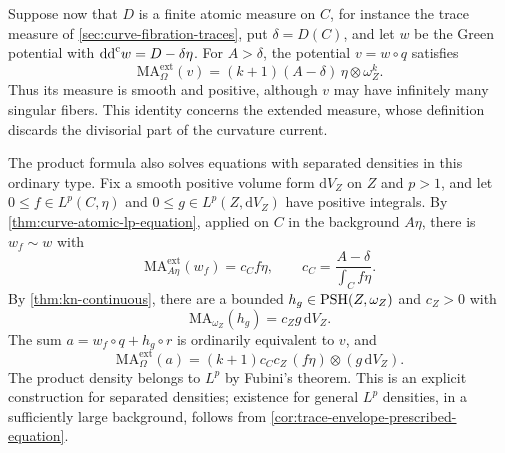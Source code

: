 Suppose now that $D$ is a finite atomic measure on $C$, for instance the trace measure of \cref{sec:curve-fibration-traces}, put $\delta=D(C)$, and let $w$ be the Green potential with $\mathrm{dd}^{\mathrm{c}} w=D-\delta\eta$. For $A>\delta$, the potential $v=w\circ q$ satisfies
\begin{equation}\label{eq:product-trace-smooth-measure}
 \mathrm{MA}^{\mathrm{ext}}_\Omega(v)
       =(k+1)(A-\delta)\,\eta\otimes\omega_Z^k.
\end{equation}
Thus its measure is smooth and positive, although $v$ may have infinitely many singular fibers. This identity concerns the extended measure, whose definition discards the divisorial part of the curvature current.

The product formula also solves equations with separated densities in this ordinary type. Fix a smooth positive volume form $\mathrm{d}V_Z$ on $Z$ and $p>1$, and let $0\leq f\in L^p(C,\eta)$ and $0\leq g\in L^p(Z,\mathrm{d}V_Z)$ have positive integrals. By \cref{thm:curve-atomic-lp-equation}, applied on $C$ in the background $A\eta$, there is $w_f\sim w$ with
\[
 \mathrm{MA}^{\mathrm{ext}}_{A\eta}(w_f)=c_C f\eta,
 \qquad c_C=\frac{A-\delta}{\int_Cf\eta}.
\]
By \cref{thm:kn-continuous}, there are a bounded $h_g\in\mathrm{PSH}(Z,\omega_Z)$ and $c_Z>0$ with
\[
 \mathrm{MA}_{\omega_Z}(h_g)=c_Zg\,\mathrm{d}V_Z.
\]
The sum $a=w_f\circ q+h_g\circ r$ is ordinarily equivalent to $v$, and
\[
 \mathrm{MA}^{\mathrm{ext}}_\Omega(a)
       =(k+1)c_Cc_Z\,(f\eta)\otimes(g\,\mathrm{d}V_Z).
\]
The product density belongs to $L^p$ by Fubini's theorem. This is an explicit construction for separated densities; existence for general $L^p$ densities, in a sufficiently large background, follows from \cref{cor:trace-envelope-prescribed-equation}.

